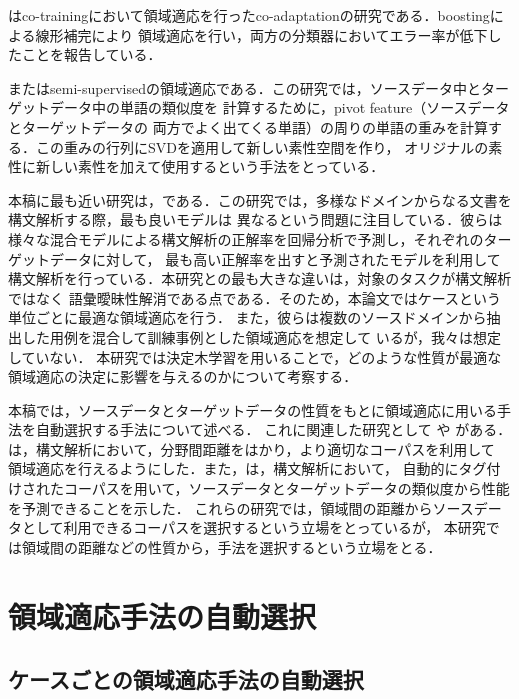 \documentclass[japanese]{jnlp_1.4}
\begin{document}
\cite{article16}はco-trainingにおいて領域適応を行ったco-adaptationの研究である．boostingによる線形補完により
領域適応を行い，両方の分類器においてエラー率が低下したことを報告している．

また\cite{article17}はsemi-supervisedの領域適応である．この研究では，ソースデータ中とターゲットデータ中の単語の類似度を
計算するために，pivot feature（ソースデータとターゲットデータの
両方でよく出てくる単語）の周りの単語の重みを計算する．この重みの行列にSVDを適用して新しい素性空間を作り，
オリジナルの素性に新しい素性を加えて使用するという手法をとっている．

本稿に最も近い研究は，\cite{article20}である．この研究では，多様なドメインからなる文書を構文解析する際，最も良いモデルは
異なるという問題に注目している．彼らは様々な混合モデルによる構文解析の正解率を回帰分析で予測し，それぞれのターゲットデータに対して，
最も高い正解率を出すと予測されたモデルを利用して構文解析を行っている．本研究との最も大きな違いは，対象のタスクが構文解析ではなく
語彙曖昧性解消である点である．そのため，本論文ではケースという単位ごとに最適な領域適応を行う．
また，彼らは複数のソースドメインから抽出した用例を混合して訓練事例とした領域適応を想定して
いるが，我々は想定していない．
本研究では決定木学習を用いることで，どのような性質が最適な領域適応の決定に影響を与えるのかについて考察する．

本稿では，ソースデータとターゲットデータの性質をもとに領域適応に用いる手法を自動選択する手法について述べる．
これに関連した研究として \cite{article10}や \cite{article11}
がある．\cite{article10}は，構文解析において，分野間距離をはかり，より適切なコーパスを利用して
領域適応を行えるようにした．また，\cite{article11}は，構文解析において，
自動的にタグ付けされたコーパスを用いて，ソースデータとターゲットデータの類似度から性能を予測できることを示した．
これらの研究では，領域間の距離からソースデータとして利用できるコーパスを選択するという立場をとっているが，
本研究では領域間の距離などの性質から，手法を選択するという立場をとる．



\section{領域適応手法の自動選択}
\label{Sec:領域適応手法の自動選択}


\subsection{ケースごとの領域適応手法の自動選択}
\label{Sec:ケースごとの領域適応手法の自動選択}
\end{document}
